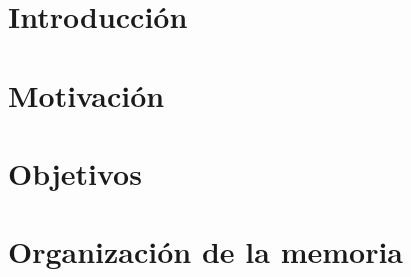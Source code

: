 


\section{Introducción}

\section{Motivación}

\section{Objetivos}

\section{Organización de la memoria}

